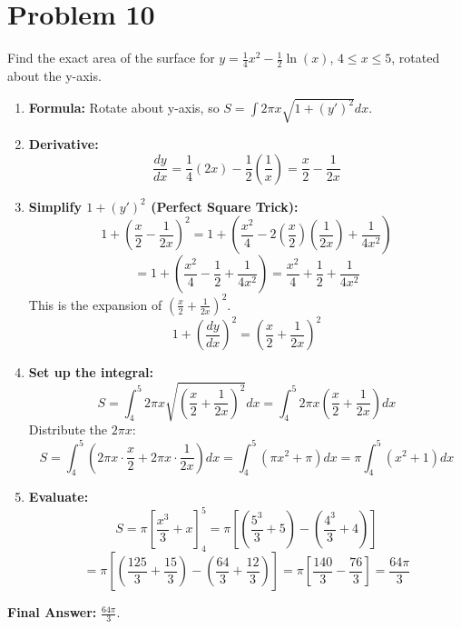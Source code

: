 \documentclass{article}
\begin{document}
\section{Problem 10}
Find the exact area of the surface for \(y=\frac{1}{4}x^2 - \frac{1}{2}\ln(x)\), \(4 \le x \le 5\), rotated about the y-axis.
\begin{enumerate}
    \item \textbf{Formula:} Rotate about y-axis, so \(S = \int 2\pi x \sqrt{1+(y')^2} dx\).
    \item \textbf{Derivative:}
    \[ \frac{dy}{dx} = \frac{1}{4}(2x) - \frac{1}{2}\left(\frac{1}{x}\right) = \frac{x}{2} - \frac{1}{2x} \]
    \item \textbf{Simplify \(1+(y')^2\) (Perfect Square Trick):}
    \[ 1 + \left(\frac{x}{2} - \frac{1}{2x}\right)^2 = 1 + \left(\frac{x^2}{4} - 2\left(\frac{x}{2}\right)\left(\frac{1}{2x}\right) + \frac{1}{4x^2}\right) \]
    \[ = 1 + \left(\frac{x^2}{4} - \frac{1}{2} + \frac{1}{4x^2}\right) = \frac{x^2}{4} + \frac{1}{2} + \frac{1}{4x^2} \]
    This is the expansion of \(\left(\frac{x}{2} + \frac{1}{2x}\right)^2\).
    \[ 1+\left(\frac{dy}{dx}\right)^2 = \left(\frac{x}{2} + \frac{1}{2x}\right)^2 \]
    \item \textbf{Set up the integral:}
    \[ S = \int_{4}^{5} 2\pi x \sqrt{\left(\frac{x}{2} + \frac{1}{2x}\right)^2} dx = \int_{4}^{5} 2\pi x \left(\frac{x}{2} + \frac{1}{2x}\right) dx \]
    Distribute the \(2\pi x\):
    \[ S = \int_{4}^{5} \left(2\pi x \cdot \frac{x}{2} + 2\pi x \cdot \frac{1}{2x}\right) dx = \int_{4}^{5} (\pi x^2 + \pi) dx = \pi \int_{4}^{5} (x^2+1) dx \]
    \item \textbf{Evaluate:}
    \[ S = \pi \left[ \frac{x^3}{3} + x \right]_{4}^{5} = \pi \left[ \left(\frac{5^3}{3} + 5\right) - \left(\frac{4^3}{3} + 4\right) \right] \]
    \[ = \pi \left[ \left(\frac{125}{3} + \frac{15}{3}\right) - \left(\frac{64}{3} + \frac{12}{3}\right) \right] = \pi \left[ \frac{140}{3} - \frac{76}{3} \right] = \frac{64\pi}{3} \]
\end{enumerate}
\textbf{Final Answer:} \(\frac{64\pi}{3}\).
\end{document}
